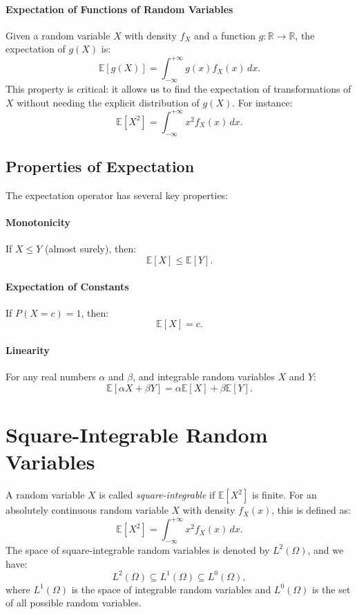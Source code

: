     \paragraph{Expectation of Functions of Random Variables}
    
    Given a random variable \(X\) with density \(f_X\) and a function \(g : \mathbb{R} \to \mathbb{R}\), the expectation of \(g(X)\) is:
    \[
    \mathbb{E}[g(X)] = \int_{-\infty}^{+\infty} g(x) f_X(x) \, dx.
    \]
    This property is critical: it allows us to find the expectation of transformations of \(X\) without needing the explicit distribution of \(g(X)\). For instance:
    \[
    \mathbb{E}[X^2] = \int_{-\infty}^{+\infty} x^2 f_X(x) \, dx.
    \]
    
    \subsection{Properties of Expectation}
    
    The expectation operator has several key properties:
    \paragraph{Monotonicity} If \(X \leq Y\) (almost surely), then:
    \[
    \mathbb{E}[X] \leq \mathbb{E}[Y].
    \]
    \paragraph{Expectation of Constants} If \({P}(X = c) = 1\), then:
    \[
    \mathbb{E}[X] = c.
    \]
    \paragraph{Linearity} For any real numbers \(\alpha\) and \(\beta\), and integrable random variables \(X\) and \(Y\):
    \[
    \mathbb{E}[\alpha X + \beta Y] = \alpha \mathbb{E}[X] + \beta \mathbb{E}[Y].
    \]

    \section{Square-Integrable Random Variables}
    A random variable \( X \) is called \emph{square-integrable} if \( \mathbb{E}[X^2] \) is finite. For an absolutely continuous random variable \( X \) with density \( f_X(x) \), this is defined as:
    \[
    \mathbb{E}[X^2] = \int_{-\infty}^{+\infty} x^2 f_X(x) \, dx.
    \]
    The space of square-integrable random variables is denoted by \( L^2(\Omega) \), and we have:
    \[
    L^2(\Omega) \subseteq L^1(\Omega) \subseteq L^0(\Omega),
    \]
    where \( L^1(\Omega) \) is the space of integrable random variables and \( L^0(\Omega) \) is the set of all possible random variables.

